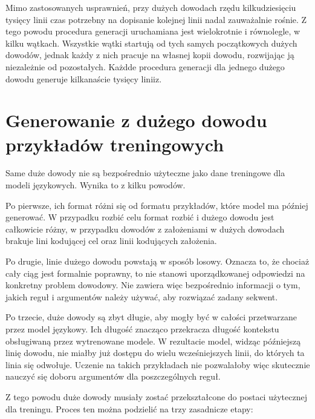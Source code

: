 \documentclass[shortabstract]{iithesis}
\theoremstyle{definition}
\theoremstyle{remark}
\theoremstyle{plain}
\begin{document}
Mimo zastosowanych usprawnień, przy dużych dowodach rzędu kilkudziesięciu tysięcy
linii czas potrzebny na dopisanie kolejnej linii nadal zauważalnie rośnie. Z tego
powodu procedura generacji uruchamiana jest wielokrotnie i równolegle, w kilku
wątkach. Wszystkie wątki startują od tych samych początkowych dużych dowodów,
jednak każdy z nich pracuje na własnej kopii dowodu, rozwijając ją niezależnie od
pozostałych. Każdde procedura generacji dla jednego dużego dowodu generuje kilkanaście tysięcy liniiz.

\section{Generowanie z dużego dowodu przykładów treningowych}

Same duże dowody nie są bezpośrednio użyteczne jako dane treningowe dla modeli
językowych. Wynika to z kilku powodów.

Po pierwsze, ich format różni się od formatu przykładów, które model ma później
generować. W przypadku rozbić celu format rozbić i dużego dowodu jest całkowicie różny, 
w przypadku dowodów z założeniami w dużych dowodach brakuje lini kodującej cel
oraz linii kodujących założenia.

Po drugie, linie dużego dowodu powstają w sposób losowy. Oznacza to, że chociaż
cały ciąg jest formalnie poprawny, to nie stanowi uporządkowanej odpowiedzi na
konkretny problem dowodowy. Nie zawiera więc bezpośrednio informacji o tym, jakich
reguł i argumentów należy używać, aby rozwiązać zadany sekwent.

Po trzecie, duże dowody są zbyt długie, aby mogły być w całości przetwarzane przez
model językowy. Ich długość znacząco przekracza długość kontekstu obsługiwaną przez
wytrenowane modele. W rezultacie model, widząc późniejszą linię dowodu, nie miałby
już dostępu do wielu wcześniejszych linii, do których ta linia się odwołuje. Uczenie
na takich przykładach nie pozwalałoby więc skutecznie nauczyć się doboru argumentów
dla poszczególnych reguł.

Z tego powodu duże dowody musiały zostać przekształcone do postaci użytecznej
dla treningu. Proces ten można podzielić na trzy zasadnicze etapy:
\end{document}
